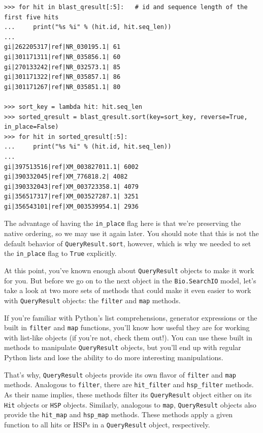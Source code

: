\documentclass{report}
\begin{document}
\begin{verbatim}
>>> for hit in blast_qresult[:5]:   # id and sequence length of the first five hits
...     print("%s %i" % (hit.id, hit.seq_len))
... 
gi|262205317|ref|NR_030195.1| 61
gi|301171311|ref|NR_035856.1| 60
gi|270133242|ref|NR_032573.1| 85
gi|301171322|ref|NR_035857.1| 86
gi|301171267|ref|NR_035851.1| 80

>>> sort_key = lambda hit: hit.seq_len
>>> sorted_qresult = blast_qresult.sort(key=sort_key, reverse=True, in_place=False)
>>> for hit in sorted_qresult[:5]:
...     print("%s %i" % (hit.id, hit.seq_len))
... 
gi|397513516|ref|XM_003827011.1| 6002
gi|390332045|ref|XM_776818.2| 4082
gi|390332043|ref|XM_003723358.1| 4079
gi|356517317|ref|XM_003527287.1| 3251
gi|356543101|ref|XM_003539954.1| 2936
\end{verbatim}

The advantage of having the \verb|in_place| flag here is that we're preserving
the native ordering, so we may use it again later. You should note that this is
not the default behavior of \verb|QueryResult.sort|, however, which is why we
needed to set the \verb|in_place| flag to \verb|True| explicitly.

At this point, you've known enough about \verb|QueryResult| objects to make it
work for you. But before we go on to the next object in the \verb|Bio.SearchIO|
model, let's take a look at two more sets of methods that could make it even
easier to work with \verb|QueryResult| objects: the \verb|filter| and \verb|map|
methods.

If you're familiar with Python's list comprehensions, generator expressions
or the built in \verb|filter| and \verb|map| functions,
you'll know how useful they are for working with list-like objects (if you're
not, check them out!). You can use these built in methods to manipulate
\verb|QueryResult| objects, but you'll end up with regular Python lists and lose
the ability to do more interesting manipulations.

That's why, \verb|QueryResult| objects provide its own flavor of
\verb|filter| and \verb|map| methods. Analogous to \verb|filter|, there are
\verb|hit_filter| and \verb|hsp_filter| methods. As their name implies, these
methods filter its \verb|QueryResult| object either on its \verb|Hit| objects
or \verb|HSP| objects. Similarly, analogous to \verb|map|, \verb|QueryResult|
objects also provide the \verb|hit_map| and \verb|hsp_map| methods. These
methods apply a given function to all hits or HSPs in a \verb|QueryResult|
object, respectively.
\end{document}
